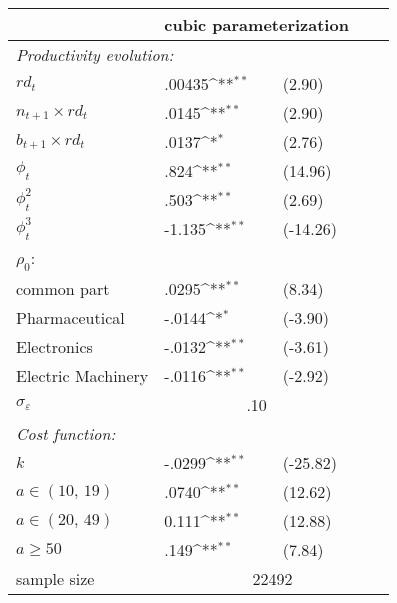 \def\sym#1{\ifmmode^{#1}\else\(^{#1}\)\fi}
\begin{tabular}{lllll}
\toprule 
 & \multicolumn{2}{c}{cubic parameterization}\\
\midrule
\multicolumn{5}{l}{\textit{Productivity evolution:}}\\
$rd_t$                    & .00435\sym{**}  & (2.90) \\
$n_{t+1} \times rd_t$     &  .0145\sym{**} & (2.90) \\
$b_{t+1} \times rd_t $     & .0137\sym{*} & (2.76) \\
$\phi_{t}$             & .824\sym{**}  & (14.96)  \\
$\phi_{t}^{2}$         & .503\sym{**} & (2.69)  \\
$\phi_{t}^{3}$         & -1.135\sym{**}& (-14.26)\\
\midrule 
$\rho_{0}$:               &  &  &  & \\
common part               &.0295\sym{**} & (8.34) \\
Pharmaceutical            & -.0144\sym{*}&(-3.90) \\
Electronics               & -.0132\sym{**} &(-3.61)\\
Electric Machinery       & -.0116\sym{**} &(-2.92) \\ 
$\sigma_{\varepsilon}$ & \multicolumn{2}{c}{.10} \\
\midrule 
\multicolumn{5}{l}{\textit{Cost function:}} \\
$k$                      & -.0299\sym{**}& (-25.82)   \\       
$a\in\left(10,\,19\right)$  & .0740\sym{**} &(12.62)\\
$a\in\left(20,\,49\right)$  & 0.111\sym{**}&(12.88)   \\
$a\geq50$                &.149\sym{**}  & (7.84) \\
\midrule              
sample size & \multicolumn{4}{c}{22492}\tabularnewline
\bottomrule
\end{tabular}

